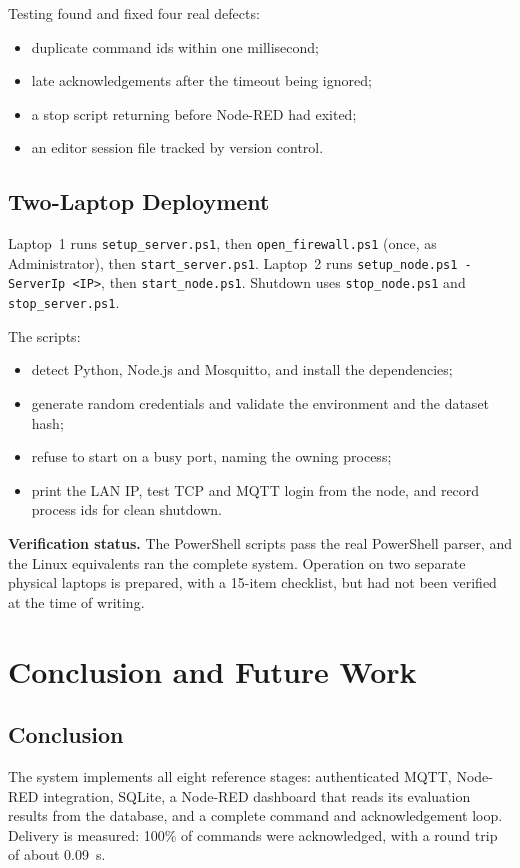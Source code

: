 \documentclass[12pt,a4paper,oneside]{report}
\begin{document}
Testing found and fixed four real defects:
\begin{itemize}
\item duplicate command ids within one millisecond;
\item late acknowledgements after the timeout being ignored;
\item a stop script returning before Node-RED had exited;
\item an editor session file tracked by version control.
\end{itemize}

\section{Two-Laptop Deployment}
Laptop~1 runs \texttt{setup\_server.ps1}, then \texttt{open\_firewall.ps1} (once, as Administrator), then
\texttt{start\_server.ps1}. Laptop~2 runs \texttt{setup\_node.ps1 -ServerIp <IP>}, then \texttt{start\_node.ps1}.
Shutdown uses \texttt{stop\_node.ps1} and \texttt{stop\_server.ps1}.

The scripts:
\begin{itemize}
\item detect Python, Node.js and Mosquitto, and install the dependencies;
\item generate random credentials and validate the environment and the dataset hash;
\item refuse to start on a busy port, naming the owning process;
\item print the LAN IP, test TCP and MQTT login from the node, and record process ids for clean shutdown.
\end{itemize}

\textbf{Verification status.} The PowerShell scripts pass the real PowerShell parser, and the Linux equivalents ran
the complete system. Operation on two separate physical laptops is prepared, with a 15-item checklist, but had not
been verified at the time of writing.

\chapter{Conclusion and Future Work}\label{ch:concl}

\section{Conclusion}
The system implements all eight reference stages: authenticated MQTT, Node-RED integration, SQLite, a Node-RED
dashboard that reads its evaluation results from the database, and a complete command and acknowledgement loop.
Delivery is measured: 100\% of commands were acknowledged, with a round trip of about 0.09~s.
\end{document}
